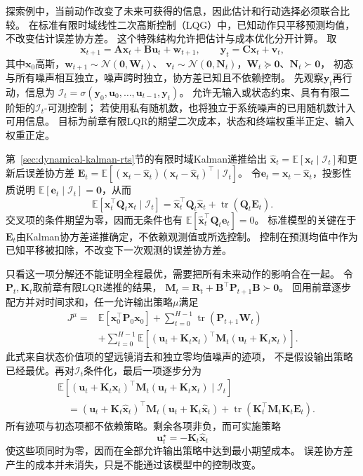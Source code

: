 探索例中，当前动作改变了未来可获得的信息，因此估计和行动选择必须联合比较。
在标准有限时域线性二次高斯控制（LQG）中，已知动作只平移预测均值，不改变估计误差协方差。
这个特殊结构允许把估计与成本优化分开计算。
取
\[
  \bm x_{t+1}=\bm A\bm x_t+\bm B\bm u_t+\bm w_{t+1},
  \qquad \bm y_t=\bm C\bm x_t+\bm v_t,
\]
其中$\bm x_0$高斯，$\bm w_{t+1}\sim\mathcal N(\bm0,\bm W_t)$、
$\bm v_t\sim\mathcal N(\bm0,\bm N_t)$，$\bm W_t\succeq\bm0$、$\bm N_t\succ\bm0$，
初态与所有噪声相互独立，噪声跨时独立，协方差已知且不依赖控制。
先观察$\bm y_t$再行动，信息为
$\mathcal I_t=\sigma(\bm y_0,\bm u_0,\ldots,\bm u_{t-1},\bm y_t)$。
允许无输入或状态约束、具有有限二阶矩的$\mathcal I_t$-可测控制；
若使用私有随机数，也将独立于系统噪声的已用随机数计入可用信息。
目标为前章有限LQR的期望二次成本，状态和终端权重半正定、输入权重正定。

第~\ref{sec:dynamical-kalman-rts}节的有限时域Kalman递推给出
$\widehat{\bm x}_t=\mathbb E[\bm x_t\mid\mathcal I_t]$和更新后误差协方差
$\bm E_t=\mathbb E[(\bm x_t-\widehat{\bm x}_t)
(\bm x_t-\widehat{\bm x}_t)^\top\mid\mathcal I_t]$。
令$\bm e_t=\bm x_t-\widehat{\bm x}_t$，投影性质说明
$\mathbb E[\bm e_t\mid\mathcal I_t]=\bm0$，从而
\[
  \mathbb E[\bm x_t^\top\bm Q_t\bm x_t\mid\mathcal I_t]
  =\widehat{\bm x}_t^\top\bm Q_t\widehat{\bm x}_t
    +\operatorname{tr}(\bm Q_t\bm E_t).
\]
交叉项的条件期望为零，因而无条件也有
$\mathbb E[\widehat{\bm x}_t^\top\bm Q_t\bm e_t]=0$。
标准模型的关键在于$\bm E_t$由Kalman协方差递推确定，不依赖观测值或所选控制。
控制在预测均值中作为已知平移被扣除，不改变下一次观测的误差协方差。

只看这一项分解还不能证明全程最优，需要把所有未来动作的影响合在一起。
令$\bm P_t,\bm K_t$取前章有限LQR递推的结果，
$\bm M_t=\bm R_t+\bm B^\top\bm P_{t+1}\bm B\succ\bm0$。
回用前章逐步配方并对时间求和，任一允许输出策略$\mu$满足
\begin{align*}
  J^\mu={}&
    \mathbb E[\bm x_0^\top\bm P_0\bm x_0]
    +\sum_{t=0}^{H-1}\operatorname{tr}(\bm P_{t+1}\bm W_t)\\
    &+\sum_{t=0}^{H-1}\mathbb E[
      (\bm u_t+\bm K_t\bm x_t)^\top
      \bm M_t(\bm u_t+\bm K_t\bm x_t)].
\end{align*}
此式来自状态价值项的望远镜消去和独立零均值噪声的迹项，
不是假设输出策略已经最优。再对$\mathcal I_t$条件化，最后一项逐步分为
\begin{align*}
  &\mathbb E[
    (\bm u_t+\bm K_t\bm x_t)^\top\bm M_t
    (\bm u_t+\bm K_t\bm x_t)\mid\mathcal I_t]\\
  &\quad=
    (\bm u_t+\bm K_t\widehat{\bm x}_t)^\top\bm M_t
    (\bm u_t+\bm K_t\widehat{\bm x}_t)
    +\operatorname{tr}(\bm K_t^\top\bm M_t\bm K_t\bm E_t).
\end{align*}
所有迹项与初态项都不依赖策略。剩余各项非负，而可实施策略
\begin{equation}
  \bm u_t^\star=-\bm K_t\widehat{\bm x}_t
  \label{eq:policy-finite-lqg-feedback}
\end{equation}
使这些项同时为零，因而在全部允许输出策略中达到最小期望成本。
误差协方差产生的成本并未消失，只是不能通过该模型中的控制改变。

